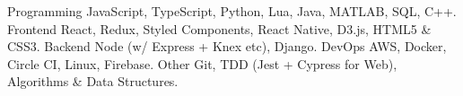 

\begin{cvskills}
  \cvskill
    {Programming} %
    {JavaScript, TypeScript, Python, Lua, Java, MATLAB, SQL, C++.} %
  \cvskill
    {Frontend} %
    {React, Redux, Styled Components, React Native, D3.js, HTML5 \& CSS3.} %
  \cvskill
    {Backend} %
    {Node (w/ Express + Knex etc), Django.} %
  \cvskill
    {DevOps} %
    {AWS, Docker, Circle CI, Linux, Firebase.} %
  \cvskill
    {Other} %
    {Git, TDD (Jest + Cypress for Web), Algorithms \& Data Structures.} %
\end{cvskills}



